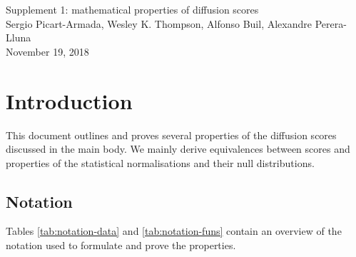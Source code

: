 \documentclass[12pt]{article}  %
\begin{document}
\begin{center}
{\Large Supplement 1: mathematical properties of diffusion scores\\}  %
\vspace{.3cm}
{\normalsize Sergio Picart-Armada, Wesley K. Thompson, Alfonso Buil, Alexandre Perera-Lluna\\} \vspace{.2cm}
{\small November 19, 2018}
\end{center}

\section*{Introduction} 

This document outlines and proves several properties of the diffusion scores discussed in the main body. 
We mainly derive equivalences between scores and properties of the statistical normalisations and their null distributions.

\subsection*{Notation} 

Tables \ref{tab:notation-data} and \ref{tab:notation-funs} contain an overview of the notation used to formulate and prove the properties.
\end{document}
